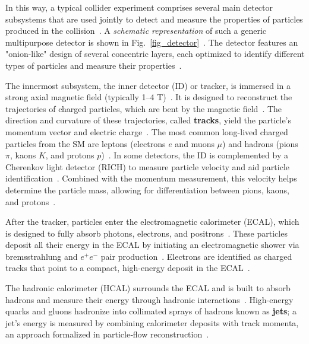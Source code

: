 In this way, a typical collider experiment comprises several main detector subsystems that are used jointly to detect and measure the properties of particles produced in the collision~\cite{CMS:2008xjf,ATLAS:2008xda,deFavereau:2013fsa,CMS:PF2017}. A \textit{schematic representation} of such a generic multipurpose detector is shown in Fig.~\ref{fig_detector}~\cite{CMS:2008xjf,deFavereau:2013fsa,Lee:2018pag}. The detector features an "onion-like" design of several concentric layers, each optimized to identify different types of particles and measure their properties~\cite{CMS:2008xjf,CMS:PF2017}.

The innermost subsystem, the inner detector (ID) or tracker, is immersed in a strong axial magnetic field (typically 1--4 T)~\cite{CMS:2008xjf,CMS:TRK2014}. It is designed to reconstruct the trajectories of charged particles, which are bent by the magnetic field~\cite{CMS:TRK2014,CMS:PF2017}. The direction and curvature of these trajectories, called \textbf{tracks}, yield the particle's momentum vector and electric charge~\cite{CMS:TRK2014,1674-1137-40-10-100001}. The most common long-lived charged particles from the SM are leptons (electrons $e$ and muons $\mu$) and hadrons (pions $\pi$, kaons $K$, and protons $p$)~\cite{1674-1137-40-10-100001}. In some detectors, the ID is complemented by a Cherenkov light detector (RICH) to measure particle velocity and aid particle identification~\cite{1674-1137-40-10-100001,Leo_1994}. Combined with the momentum measurement, this velocity helps determine the particle mass, allowing for differentiation between pions, kaons, and protons~\cite{1674-1137-40-10-100001,Leo_1994}.

After the tracker, particles enter the electromagnetic calorimeter (ECAL), which is designed to fully absorb photons, electrons, and positrons~\cite{CMS_EGM_17001,CMS:2008xjf}. These particles deposit all their energy in the ECAL by initiating an electromagnetic shower via bremsstrahlung and $e^{+}e^{-}$ pair production~\cite{CMS_EGM_17001}. Electrons are identified as charged tracks that point to a compact, high-energy deposit in the ECAL~\cite{CMS_EGM_17001}.

The hadronic calorimeter (HCAL) surrounds the ECAL and is built to absorb hadrons and measure their energy through hadronic interactions~\cite{CMS:2008xjf,deFavereau:2013fsa}. High-energy quarks and gluons hadronize into collimated sprays of hadrons known as \textbf{jets}; a jet's energy is measured by combining calorimeter deposits with track momenta, an approach formalized in particle‑flow reconstruction~\cite{CMS:PF2017,Cacciari:2011ma,Cacciari:2008gp}.

